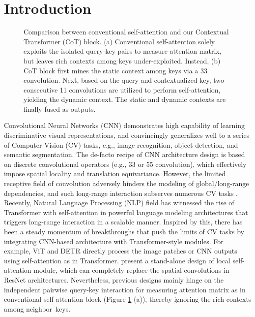 \documentclass[10pt,twocolumn,letterpaper]{article}
\begin{document}
\section{Introduction}

\begin{figure}[!tb]
\vspace{-0.33in}
\vspace{-0.1in}
\caption{Comparison between conventional self-attention and our Contextual Transformer (CoT) block. (a) Conventional self-attention solely exploits the isolated query-key pairs to measure attention matrix, but leaves rich contexts among keys under-exploited. Instead, (b) CoT block first mines the static context among keys via a 33 convolution. Next, based on the query and contextualized key, two consecutive 11 convolutions are utilized to perform self-attention, yielding the dynamic context. The static and dynamic contexts are finally fused as outputs.}
\label{fig:fig1}
\vspace{-0.28in}
\end{figure}


Convolutional Neural Networks (CNN) \cite{chollet2017xception,dai2017deformable,he2016deep,krizhevsky2012imagenet,simonyan2014very,szegedy2015going,tan2019efficientnet} demonstrates high capability of learning discriminative visual representations, and convincingly generalizes well to a series of Computer Vision (CV) tasks, e.g., image recognition, object detection, and semantic segmentation. The de-facto recipe of CNN architecture design is based on discrete convolutional operators (e.g., 33 or 55 convolution), which effectively impose spatial locality and translation equivariance. However, the limited receptive field of convolution adversely hinders the modeling of global/long-range dependencies, and such long-range interaction subserves numerous CV tasks \cite{mottaghi2014role,rabinovich2007objects}. Recently, Natural Language Processing (NLP) field has witnessed the rise of Transformer with self-attention in powerful language modeling architectures \cite{devlin2018bert,vaswani2017attention} that triggers long-range interaction in a scalable manner. Inspired by this, there has been a steady momentum of breakthroughs \cite{bello2019attention,carion2020end,dosovitskiy2020image,li2021scheduled,pan2020x,ramachandran2019stand,zhao2020exploring} that push the limits of CV tasks by integrating CNN-based architecture with Transformer-style modules. For example, ViT \cite{dosovitskiy2020image} and DETR \cite{carion2020end} directly process the image patches or CNN outputs using self-attention as in Transformer. \cite{ramachandran2019stand,zhao2020exploring} present a stand-alone design of local self-attention module, which can completely replace the spatial convolutions in ResNet architectures.
Nevertheless, previous designs mainly hinge on the independent pairwise query-key interaction for measuring attention matrix as in conventional self-attention block (Figure \ref{fig:fig1} (a)), thereby ignoring the rich contexts among neighbor~keys.
\end{document}
